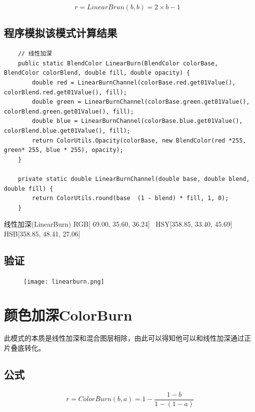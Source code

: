 \begin{equation}r=LinearBrun(b,b)=2\times b-1\end{equation}

\subsection{ 程序模拟该模式计算结果}

\begin{lstlisting}
	// 线性加深
	public static BlendColor LinearBurn(BlendColor colorBase, BlendColor colorBlend, double fill, double opacity) {
		double red = LinearBurnChannel(colorBase.red.get01Value(), colorBlend.red.get01Value(), fill);
		double green = LinearBurnChannel(colorBase.green.get01Value(), colorBlend.green.get01Value(), fill);
		double blue = LinearBurnChannel(colorBase.blue.get01Value(), colorBlend.blue.get01Value(), fill);
		return ColorUtils.Opacity(colorBase, new BlendColor(red *255, green* 255, blue * 255), opacity);
	}
	
	private static double LinearBurnChannel(double base, double blend, double fill) {
		return ColorUtils.round(base  (1 - blend) * fill, 1, 0);
	}
\end{lstlisting}



\begin{result}
 \item 线性加深(LinearBurn)    RGB[ 69.00,  35.60,  36.24]~ HSY[358.85,  33.40,  45.69]~ HSB[358.85,  48.41,  27.06]
\end{result}

\subsection{ 验证}

\begin{figure}[!htb]
	\centering
	\texttt{[image: linearburn.png]}
\end{figure}
%
%
\newpage
\section{ 颜色加深ColorBurn}
此模式的本质是线性加深和混合图层相除，由此可以得知他可以和线性加深通过正片叠底转化。
\subsection{ 公式}
\begin{equation}\begin{aligned}&r=ColorBurn(b,a)=1-\dfrac{1-b}{1-(1-a)}\end{aligned}\end{equation}

